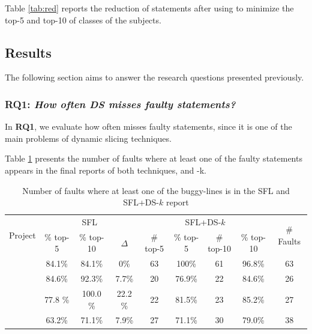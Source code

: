 \documentclass{article}
\begin{document}
Table \ref{tab:red} reports the reduction of statements after using \ds{} to minimize the top-5 and top-10 of classes of the subjects.


\subsection{Results}

The following section aims to answer the research questions presented previously.


\subsubsection{RQ1: \textit{How often DS misses faulty statements?}}
\label{sec:fault-misses}

In \textbf{RQ1}, we evaluate how often \ds{} misses faulty statements, since it is one of the main problems of dynamic slicing techniques.

Table \ref{table:fsws} presents the number of faults where at least one of the faulty statements appears in the final reports of both techniques, \sfl{} and \comb{}-k.


\begin{table}[h]
	\centering
	  \begin{tabular}{|l|ccc|cccc|c|}
		\toprule
		\multirow{2}{*}{Project}            & \multicolumn{3}{c|}{SFL}  & \multicolumn{4}{c|}{SFL+DS-$k$} & \multirow{2}{*}{\# Faults} \\

		            & \% top-5 & \% top-10  & $\Delta$ & \# top-5 & \% top-5 & \# top-10 & \% top-10 &  \\
		\midrule
		 \lang{}            & 84.1\%  & 84.1\%  &  0\%   & 63 & 100\% & 61 & 96.8\% & 63      \\
		\chart{}           & 84.6\%  & 92.3\% & 7.7\%  & 20 & 76.9\% & 22 & 84.6\% & 26    \\  %
		\jtime{}           & 77.8 \%  & 100.0 \% & 22.2 \%  & 22 & 81.5\% & 23 & 85.2\% & 27     \\   %
		 \mockito{}         & 63.2\%  & 71.1\% & 7.9\%   & 27 & 71.1\% & 30 & 79.0\% & 38 \\     %
		\bottomrule
	\end{tabular}
  \caption {Number of faults where at least one of the buggy-lines is in the SFL and SFL+DS-$k$ report }
  \label{table:fsws}
\end{table}
\end{document}
